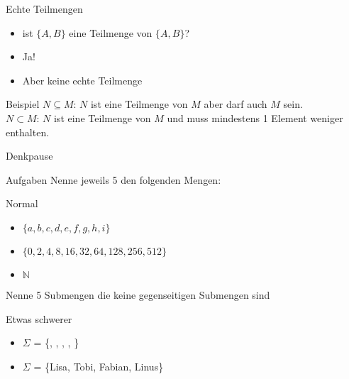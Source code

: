 \begin{frame}{Echte Teilmengen}
    \begin{itemize}
        \item ist $\{A,B\}$ eine Teilmenge von $\{A,B\}$?
        \pause
        \item \alert{Ja!}
        \pause
        \item Aber keine \alert{echte} Teilmenge
    \end{itemize}
    \pause
    \begin{exampleblock}{Beispiel}
                $N \subseteq M$: $N$ ist eine Teilmenge von $M$ aber darf auch $M$ sein.\\
                $N \subset M$: $N$ ist eine Teilmenge von $M$ und muss mindestens 1 Element weniger enthalten.
    \end{exampleblock}
\end{frame}

{
\begin{frame}[fragile]{Denkpause}
    \begin{alertblock}{Aufgaben}
    Nenne jeweils 5 den folgenden Mengen:
    \end{alertblock}
    
    \begin{block}{Normal}
        \begin{itemize}
            \item $\{a, b, c, d, e, f, g, h, i\}$
            \item $\{0, 2, 4, 8, 16, 32, 64, 128, 256, 512\}$
            \item $\mathbb N$
        \end{itemize}
    \end{block}
    Nenne 5 Submengen die keine gegenseitigen Submengen sind
    \begin{block}{Etwas schwerer}
        \begin{itemize}
            \item $\Sigma$ = \{\WashCotton, \NoWash, \IroningII, \Tumbler, \SpecialForty \}
            \item $\Sigma$ = \{Lisa, Tobi, Fabian, Linus\}
        \end{itemize}
    \end{block}
\end{frame}
}

